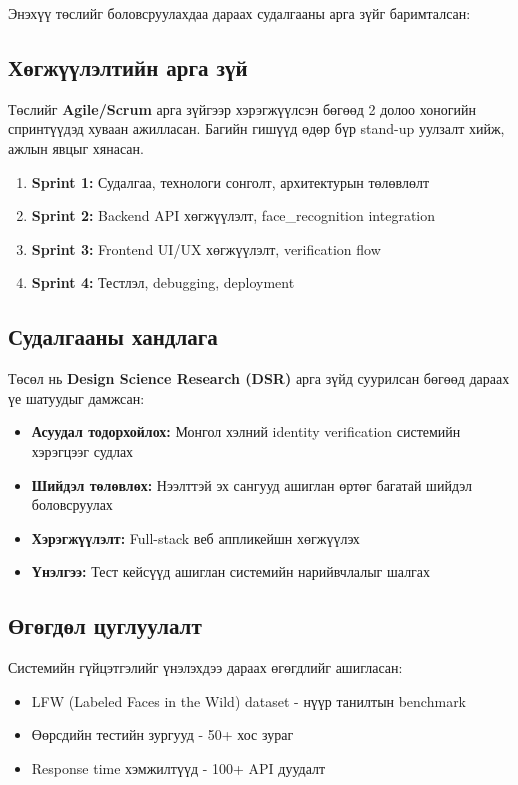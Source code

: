 \documentclass[12pt,a4paper]{article}
\begin{document}
Энэхүү төслийг боловсруулахдаа дараах судалгааны арга зүйг баримталсан:

\subsection{Хөгжүүлэлтийн арга зүй}

Төслийг \textbf{Agile/Scrum} арга зүйгээр хэрэгжүүлсэн бөгөөд 2 долоо хоногийн спринтүүдэд хуваан ажилласан. Багийн гишүүд өдөр бүр stand-up уулзалт хийж, ажлын явцыг хянасан.

\begin{enumerate}[leftmargin=1.2cm]
  \item \textbf{Sprint 1:} Судалгаа, технологи сонголт, архитектурын төлөвлөлт
  \item \textbf{Sprint 2:} Backend API хөгжүүлэлт, face\_recognition integration
  \item \textbf{Sprint 3:} Frontend UI/UX хөгжүүлэлт, verification flow
  \item \textbf{Sprint 4:} Тестлэл, debugging, deployment
\end{enumerate}

\subsection{Судалгааны хандлага}

Төсөл нь \textbf{Design Science Research (DSR)} арга зүйд суурилсан бөгөөд дараах үе шатуудыг дамжсан:

\begin{itemize}[leftmargin=1cm]
  \item \textbf{Асуудал тодорхойлох:} Монгол хэлний identity verification системийн хэрэгцээг судлах
  \item \textbf{Шийдэл төлөвлөх:} Нээлттэй эх сангууд ашиглан өртөг багатай шийдэл боловсруулах
  \item \textbf{Хэрэгжүүлэлт:} Full-stack веб аппликейшн хөгжүүлэх
  \item \textbf{Үнэлгээ:} Тест кейсүүд ашиглан системийн нарийвчлалыг шалгах
\end{itemize}

\subsection{Өгөгдөл цуглуулалт}

Системийн гүйцэтгэлийг үнэлэхдээ дараах өгөгдлийг ашигласан:
\begin{itemize}[leftmargin=1cm]
  \item LFW (Labeled Faces in the Wild) dataset - нүүр танилтын benchmark
  \item Өөрсдийн тестийн зургууд - 50+ хос зураг
  \item Response time хэмжилтүүд - 100+ API дуудалт
\end{itemize}
\end{document}
